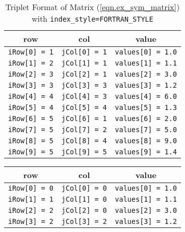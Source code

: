 \documentclass[10pt]{article}
\begin{document}
\begin{footnotesize}
\begin{table}[ht]%
\begin{center}
\begin{tabular}{c c c}
row     		&       col     	&       value 			    \\
\hline
{\tt iRow[0] = 1}       &       {\tt jCol[0] = 1}       & {\tt values[0] = 1.0}     \\
{\tt iRow[1] = 2}       &       {\tt jCol[1] = 1}       & {\tt values[1] = 1.1}     \\
{\tt iRow[2] = 3}       &       {\tt jCol[2] = 1}       & {\tt values[2] = 3.0}     \\
{\tt iRow[3] = 3}       &       {\tt jCol[3] = 3}       & {\tt values[3] = 1.2}     \\
{\tt iRow[4] = 4}       &       {\tt jCol[4] = 3}       & {\tt values[4] = 6.0}     \\
{\tt iRow[5] = 4}       &       {\tt jCol[5] = 4}       & {\tt values[5] = 1.3}     \\
{\tt iRow[6] = 5}       &       {\tt jCol[6] = 1}       & {\tt values[6] = 2.0}     \\
{\tt iRow[7] = 5}       &       {\tt jCol[7] = 2}       & {\tt values[7] = 5.0}     \\
{\tt iRow[8] = 5}       &       {\tt jCol[8] = 4}       & {\tt values[8] = 9.0}     \\
{\tt iRow[9] = 5}       &       {\tt jCol[9] = 5}       & {\tt values[9] = 1.4}
\end{tabular}
\caption{Triplet Format of Matrix (\ref{eqn.ex_sym_matrix}) 
with {\tt index\_style=FORTRAN\_STYLE}}
\label{tab.sym_fortran_triplet}
\end{center}
\end{table}
\begin{table}[ht]%
\begin{center}
\begin{tabular}{c c c}
row     		&       col     	&       value 			    \\
\hline
{\tt iRow[0] = 0}       &       {\tt jCol[0] = 0}       & {\tt values[0] = 1.0}     \\
{\tt iRow[1] = 1}       &       {\tt jCol[1] = 0}       & {\tt values[1] = 1.1}     \\
{\tt iRow[2] = 2}       &       {\tt jCol[2] = 0}       & {\tt values[2] = 3.0}     \\
{\tt iRow[3] = 2}       &       {\tt jCol[3] = 2}       & {\tt values[3] = 1.2}     \\

\end{tabular}
\end{center}
\end{table}
\end{footnotesize}
\end{document}
